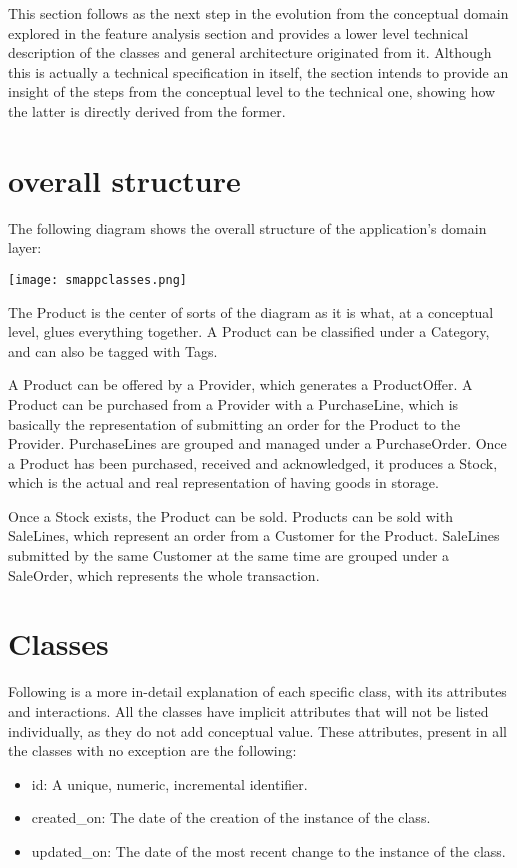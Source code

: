 This section follows as the next step in the evolution from the conceptual domain explored in the feature analysis section and provides a lower level technical description of the classes and general architecture originated from it. Although this is actually a technical specification in itself, the section intends to provide an insight of the steps from the conceptual level to the technical one, showing how the latter is directly derived from the former.

\section{overall structure}
The following diagram shows the overall structure of the application’s domain layer:

\texttt{[image: smappclasses.png]}

The Product is the center of sorts of the diagram as it is what, at a conceptual level, glues everything together. A Product can be classified under a Category, and can also be tagged with Tags.

A Product can be offered by a Provider, which generates a ProductOffer. A Product can be purchased from a Provider with a PurchaseLine, which is basically the representation of submitting an order for the Product to the Provider. PurchaseLines are grouped and managed under a PurchaseOrder. Once a Product has been purchased, received and acknowledged, it produces a Stock, which is the actual and real representation of having goods in storage.

Once a Stock exists, the Product can be sold. Products can be sold with SaleLines, which represent an order from a Customer for the Product. SaleLines submitted by the same Customer at the same time are grouped under a SaleOrder, which represents the whole transaction.

\section{Classes}
Following is a more in-detail explanation of each specific class, with its attributes and interactions. All the classes have implicit attributes that will not be listed individually, as they do not add conceptual value. These attributes, present in all the classes with no exception are the following:

\begin{itemize}
\item id: A unique, numeric, incremental identifier.
\item created\_on: The date of the creation of the instance of the class.
\item updated\_on: The date of the most recent change to the instance of the class.
\end{itemize}

